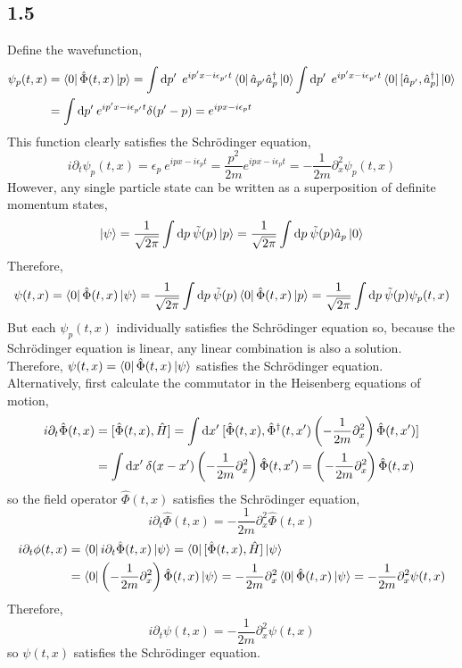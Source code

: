 \documentclass[12pt]{extarticle}
\newcommand{\field}{\hat{\Phi}}
\newcommand{\dfield}{\hat{\Phi}^\dagger}
\begin{document}
\subsection*{1.5}
Define the wavefunction,
\begin{align*}
\psi_p(t, x) & = \bra{0} \field(t, x) \ket{p} = \int \d{p'} \: e^{i p' x - i \epsilon_{p'} t} \bra{0} \a_{p'} \adag_p \ket{0} \int \d{p'} \: e^{i p' x - i \epsilon_{p'} t} \bra{0} [\a_{p'},  \adag_p] \ket{0} 
\\
& = \int \d{p'}  e^{i p' x - i \epsilon_{p'} t} \delta(p' - p) = e^{i p x - i \epsilon_p t}
\end{align*}
This function clearly satisfies the Schrödinger equation, 
\[ i \partial_t \psi_p(t, x) = \epsilon_p \: e^{i p x - i \epsilon_p t} = \frac{p^2}{2m} e^{i p x - i \epsilon_p t} = - \frac{1}{2m} \partial_x^2 \psi_p(t, x)\]
However, any single particle state can be written as a superposition of definite momentum states,
\[ \left| \psi \right> = \frac{1}{\sqrt{2 \pi}} \int \mathrm{d}p \: \tilde{\psi}(p) \left| p \right> = \frac{1}{\sqrt{2 \pi}} \int \mathrm{d}p \: \tilde{\psi}(p) \hat{a}_p \left| 0 \right> \]
Therefore,
\[ \psi(t, x) = \bra{0} \field(t, x) \ket{\psi} = \frac{1}{\sqrt{2 \pi}} \int \d{p} \tilde{\psi}(p) \bra{0} \field(t, x) \ket{p} = \frac{1}{\sqrt{2 \pi}} \int \d{p} \tilde{\psi}(p) \psi_p(t, x) \]
But each $\psi_p(t, x)$ individually satisfies the Schrödinger equation so, because the Schrödinger equation is linear, any linear combination is also a solution. Therefore, $\psi(t, x) = \bra{0} \field(t, x) \ket{\psi}$ satisfies the Schrödinger equation. \bigskip \\
Alternatively, first calculate the commutator in the Heisenberg equations of motion,
\begin{align*}
i \partial_t \field(t, x) & = [\field(t, x), \hamilt] = \int \d{x'} [ \field(t, x), \dfield(t, x') \left( - \frac{1}{2m} \partial_{x}^2 \right) \field(t, x')]
\\
& = \int \d{x'} \delta(x - x') \left( - \frac{1}{2m} \partial_{x}^2 \right) \field(t, x') = \left( - \frac{1}{2m} \partial_{x}^2 \right) \field(t, x)
\end{align*} 
so the field operator $\field(t, x)$ satisfies the Schrödinger equation,
\[ i \partial_t \field(t, x) = - \frac{1}{2m} \partial_{x}^2 \field(t, x)\]
\begin{align*}
i \partial_t \phi(t, x) & = \bra{0} i \partial_t \field(t, x) \ket{\psi} = \bra{0} [\field(t, x), \hamilt] \ket{\psi}
\\
& = \bra{0} \left( - \frac{1}{2m} \partial_{x}^2 \right) \field(t, x) \ket{\psi} 
= - \frac{1}{2m} \partial_x^2 \bra{0} \field(t, x) \ket{\psi} = - \frac{1}{2m} \partial_x^2 \psi(t, x)
\end{align*} 
Therefore,
\[ i \partial_t \psi(t, x) = - \frac{1}{2m} \partial_x^2 \psi(t, x)\]
so $\psi(t, x)$ satisfies the Schrödinger equation. 
\end{document}
